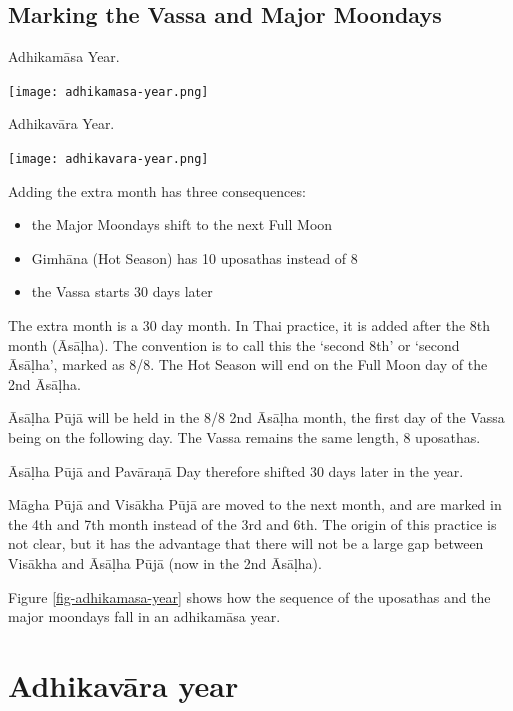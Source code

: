 \documentclass[11pt,oneside]{memoir-article}
\begin{document}
\subsection{Marking the Vassa and Major Moondays}
\label{sec-2-3-1}
\label{marking-the-moondays-adhikamasa-year}

\begin{marginfigure}[-25mm]
\caption{\label{fig-adhikamasa-year} Adhikamāsa Year.}
\texttt{[image: adhikamasa-year.png]}
\end{marginfigure}

\begin{marginfigure}
\caption{\label{fig-adhikavara-year} Adhikavāra Year.}
\texttt{[image: adhikavara-year.png]}
\end{marginfigure}

Adding the extra month has three consequences:

\begin{itemize}
\item the Major Moondays shift to the next Full Moon
\item Gimhāna (Hot Season) has 10 uposathas instead of 8
\item the Vassa starts 30 days later
\end{itemize}

The extra month is a 30 day month. In Thai practice, it is added after the 8th
month (Āsāḷha). The convention is to call this the `second 8th' or `second
Āsāḷha', marked as 8/8. The Hot Season will end on the Full Moon day of the 2nd
Āsāḷha.

Āsāḷha Pūjā will be held in the 8/8 2nd Āsāḷha month, the first day of the
Vassa being on the following day. The Vassa remains the same length, 8 uposathas.

Āsāḷha Pūjā and Pavāraṇā Day therefore shifted 30 days later in the year.

Māgha Pūjā and Visākha Pūjā are moved to the next month, and are marked in the
4th and 7th month instead of the 3rd and 6th. The origin of this practice is not
clear, but it has the advantage that there will not be a large gap between
Visākha and Āsāḷha Pūjā (now in the 2nd Āsāḷha).


Figure \ref{fig-adhikamasa-year} shows how the sequence of the uposathas and the
major moondays fall in an adhikamāsa year.

\section{Adhikavāra year}
\label{sec-2-4}
\end{document}
